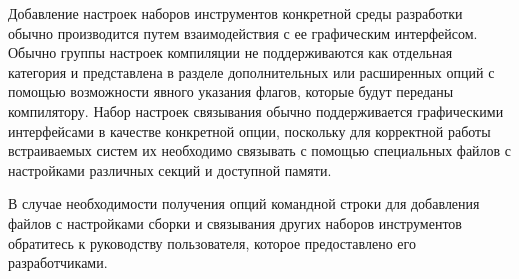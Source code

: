 Добавление настроек наборов инструментов конкретной среды разработки
обычно производится путем взаимодействия
с ее графическим интерфейсом. Обычно группы настроек компиляции не поддерживаются
как отдельная категория и представлена в разделе дополнительных или расширенных
опций с помощью возможности явного указания флагов, которые будут переданы
компилятору.
Набор настроек связывания обычно поддерживается графическими интерфейсами
в качестве конкретной опции, поскольку для корректной работы встраиваемых систем
их необходимо связывать с помощью специальных файлов с настройками различных секций
и доступной памяти.

В случае необходимости получения опций командной строки
для добавления файлов с настройками сборки и связывания
других наборов инструментов
обратитесь к руководству пользователя, которое предоставлено его разработчиками.
